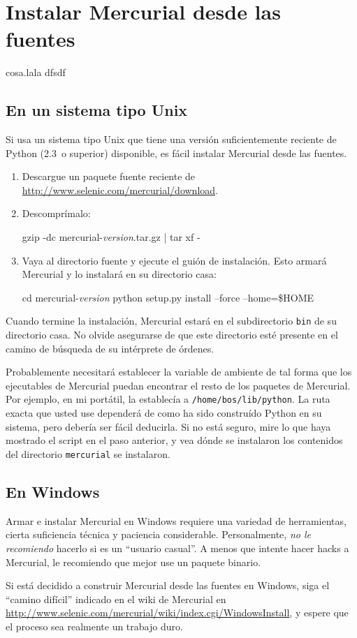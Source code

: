 \chapter{Instalar Mercurial desde las fuentes}
\label{chap:srcinstall}
cosa.lala dfsdf

\section{En un sistema tipo Unix}
\label{sec:srcinstall:unixlike}

Si usa un sistema tipo Unix que tiene una versión suficientemente
reciente de Python (2.3~o superior) disponible, es fácil instalar
Mercurial desde las fuentes.
\begin{enumerate}
\item Descargue un paquete fuente reciente de
  \url{http://www.selenic.com/mercurial/download}.
\item Descomprímalo:
  \begin{codesample4}
    gzip -dc mercurial-\emph{version}.tar.gz | tar xf -
  \end{codesample4}
\item Vaya al directorio fuente y ejecute el guión de instalación.
  Esto armará Mercurial y lo instalará en su directorio casa:
  \begin{codesample4}
    cd mercurial-\emph{version}
    python setup.py install --force --home=\$HOME
  \end{codesample4}
\end{enumerate}
Cuando termine la instalación, Mercurial estará en el subdirectorio
\texttt{bin} de su directorio casa.  No olvide asegurarse de que este
directorio esté presente en el camino de búsqueda de su intérprete de
órdenes.

Probablemente necesitará establecer la variable de ambiente
 de tal forma que los ejecutables de Mercurial
puedan encontrar el resto de los paquetes de Mercurial.  Por ejemplo,
en mi portátil, la establecía a \texttt{/home/bos/lib/python}.  La
ruta exacta que usted use dependerá de como ha sido construído Python
en su sistema, pero debería ser fácil deducirla.  Si no está seguro,
mire lo que haya mostrado el script en el paso anterior, y vea dónde
se instalaron los contenidos del directorio \texttt{mercurial} se
instalaron.

\section{En Windows}

Armar e instalar Mercurial en Windows requiere una variedad de
herramientas, cierta suficiencia técnica y paciencia considerable.
Personalmente, \emph{no le recomiendo} hacerlo si es un ``usuario
casual''.  A menos que intente hacer hacks a Mercurial, le recomiendo
que mejor use un paquete binario.

Si está decidido a construir Mercurial desde las fuentes en Windows,
siga el ``camino difícil'' indicado en el wiki de Mercurial en
\url{http://www.selenic.com/mercurial/wiki/index.cgi/WindowsInstall},
y espere que el proceso sea realmente un trabajo duro.

